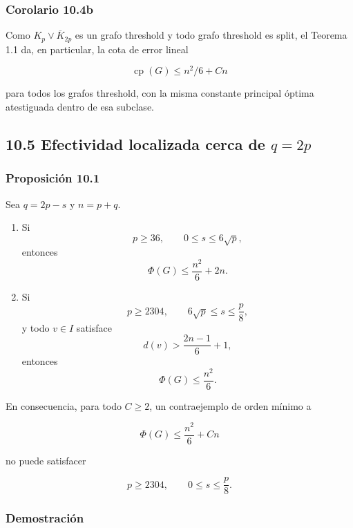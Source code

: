 \documentclass[
  11pt,
]{article}
\begin{document}
\subsubsection{Corolario 10.4b}\label{corolario-10.4b-grafos-threshold}

Como \(K_p\vee\overline K_{2p}\) es un grafo threshold y todo grafo
threshold es split, el Teorema 1.1 da, en particular, la cota de error
lineal

\[
\operatorname{cp}(G)\le n^2/6+Cn
\]

para todos los grafos threshold, con la misma constante principal óptima
atestiguada dentro de esa subclase.

\subsection{\texorpdfstring{10.5 Efectividad localizada cerca de
\(q=2p\)}{10.5 Efectividad localizada cerca de q=2p}}\label{efectividad-localizada-cerca-de-q2p}

\subsubsection{Proposición 10.1}\label{proposiciuxf3n-10.1-cotas-expluxedcitas-para-el-corredor}

Sea \(q=2p-s\) y \(n=p+q\).

\begin{enumerate}
\def\labelenumi{\arabic{enumi}.}
\item
  Si \[
  p\ge36,
  \qquad
  0\le s\le6\sqrt p,
  \] entonces \[
  \boxed{
  \Phi(G)\le\frac{n^2}{6}+2n.
  }
  \tag{10.2}
  \]
\item
  Si \[
  p\ge2304,
  \qquad
  6\sqrt p\le s\le\frac p8,
  \] y todo \(v\in I\) satisface \[
  d(v)>\frac{2n-1}{6}+1,
  \] entonces \[
  \boxed{
  \Phi(G)\le\frac{n^2}{6}.
  }
  \tag{10.3}
  \]
\end{enumerate}

En consecuencia, para todo \(C\ge2\), un contraejemplo de orden mínimo a

\[
\Phi(G)\le\frac{n^2}{6}+Cn
\]

no puede satisfacer

\[
p\ge2304,
\qquad
0\le s\le\frac p8.
\]

\subsubsection{Demostración}\label{demostraciuxf3n-6}
\end{document}
